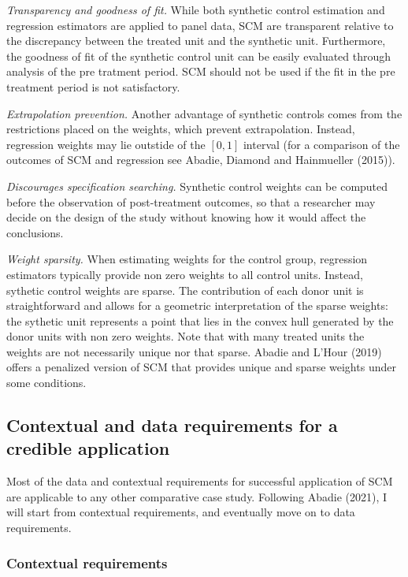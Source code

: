 \documentclass[12pt,a4paper,draft]{article}
\begin{document}
\emph{Transparency and goodness of fit.} While both 
synthetic control estimation and regression estimators are applied to panel data, 
SCM are transparent relative to the discrepancy between the treated unit and the 
synthetic unit. Furthermore, the goodness of fit of the synthetic control unit 
can be easily evaluated through analysis of the pre tratment period. SCM should 
not be used if the fit in the pre treatment period is not satisfactory.

\emph{Extrapolation prevention.} Another advantage of synthetic controls comes from the 
restrictions placed on the weights, which prevent extrapolation. Instead, 
regression weights may lie outstide of the $[0,1]$ interval (for a comparison 
of the outcomes of SCM and regression see Abadie, Diamond and Hainmueller (2015)). 

\emph{Discourages specification searching.} Synthetic control weights can be computed 
before the observation of post-treatment outcomes, so that a researcher may decide 
on the design of the study without knowing how it would affect the conclusions.

\emph{Weight sparsity.} When estimating weights for 
the control group, regression estimators typically provide non zero weights to all control 
units. Instead, sythetic control weights are sparse. The contribution of each 
donor unit is straightforward and allows for a geometric interpretation of the 
sparse weights: the sythetic unit represents a point that lies in the convex hull 
generated by the donor units with non zero weights.
Note that with many treated units the weights are not necessarily unique nor 
that sparse. Abadie and L'Hour (2019) offers a penalized version of SCM that 
provides unique and sparse weights under some conditions.



\subsection{Contextual and data requirements for a credible application}

Most of the data and contextual requirements for successful application of 
SCM are applicable to any other comparative case study. Following Abadie (2021), I 
will start from contextual requirements, and eventually move on to data requirements.


\subsubsection{Contextual requirements}
\end{document}
